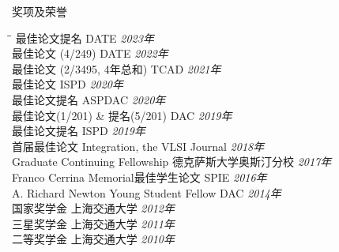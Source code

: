 
\begin{rSection}{奖项及荣誉}
\begin{tabbing}
\hspace{3.8in}\= \hspace{2.6in}\= \kill
最佳论文提名 \> DATE \> {\em 2023年 } \\
最佳论文 (4/249) \> DATE \> {\em 2022年 } \\
最佳论文 (2/3495, 4年总和) \> TCAD \> {\em 2021年 } \\
最佳论文 \> ISPD \> {\em 2020年 } \\
最佳论文提名 \> ASPDAC \> {\em 2020年 } \\
最佳论文(1/201) \& 提名(5/201) \> DAC \> {\em 2019年 } \\
最佳论文提名 \> ISPD \> {\em 2019年 } \\
首届最佳论文 \> Integration, the VLSI Journal \> {\em 2018年 } \\
Graduate Continuing Fellowship \> 德克萨斯大学奥斯汀分校 \> {\em 2017年 } \\
Franco Cerrina Memorial最佳学生论文 \> SPIE \> {\em 2016年 } \\
A. Richard Newton Young Student Fellow \> DAC \> {\em 2014年 } \\
国家奖学金 \> 上海交通大学 \> {\em 2012年 } \\
三星奖学金 \> 上海交通大学 \> {\em 2011年 } \\
二等奖学金 \> 上海交通大学 \> {\em 2010年 }
\end{tabbing}
\end{rSection}

